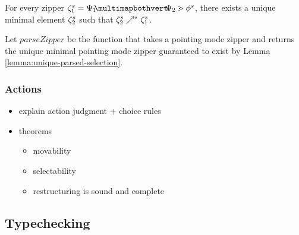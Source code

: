 \begin{lemma}
  For every zipper $\zip^s_1 = \zipper{\pointing{\selection_1}{\selection_2}}{\tfrelem^s}$, there exists
  a unique minimal element $\zeta^s_2$ such that $\zeta^s_2 \nearrow^* \zeta^s_1$.
\end{lemma}

\begin{definition}
  Let $parseZipper$ be the function that takes a pointing mode
  zipper
  and returns the unique minimal pointing mode zipper guaranteed to exist
  by Lemma \ref{lemma:unique-parsed-selection}.
\end{definition}


% 






\subsubsection{Actions}


\begin{itemize}
  \item explain action judgment + choice rules
  \item theorems
  \begin{itemize}
    \item movability
    \item selectability
    \item restructuring is sound and complete
  \end{itemize}
\end{itemize}

\subsection{Typechecking}
